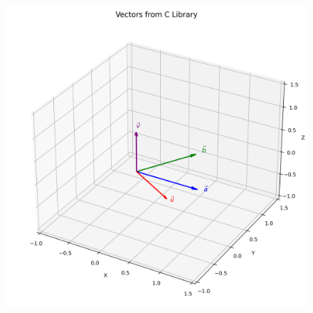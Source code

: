 \documentclass[12pt]{article}
\begin{document}
\begin{figure}[H]
    \centering
    \includegraphics[width=0.9\columnwidth]{figs/vector_plot.png}
    \caption{}
    \label{fig:placeholder}
\end{figure}
\end{document}
